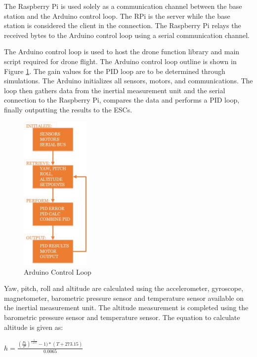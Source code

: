 The Raspberry Pi is used solely as a communication channel between the base station and the Arduino control loop. The RPi is the server while the base station is considered the client in the connection. The Raspberry Pi relays the received bytes to the Arduino control loop using a serial communication channel. 

The Arduino control loop is used to host the drone function library and main script required for drone flight. The Arduino control loop outline is shown in Figure \ref{fig:ctl_loop}. The gain values for the PID loop are to be determined through simulations. The Arduino initializes all sensors, motors, and communications. The loop then gathers data from the inertial measurement unit and the serial connection to the Raspberry Pi, compares the data and performs a PID loop, finally outputting the results to the ESCs.

\begin{figure}[H]
	\centering
	\includegraphics[width=0.3\textwidth]{control-loop.jpg}
	\caption{Arduino Control Loop}
	\label{fig:ctl_loop}	
\end{figure}

Yaw, pitch, roll and altitude are calculated using the accelerometer, gyroscope, magnetometer, barometric pressure sensor and temperature sensor available on the inertial measurement unit. The altitude measurement is completed using the barometric pressure sensor and temperature sensor. The equation to calculate altitude is given as: 

\vspace*{0.2in}
$h=\frac{(\frac{P_{0}}{P})^\frac{1}{5.257}-1)*(T+273.15)}{0.0065}$
\vspace*{0.2in}

